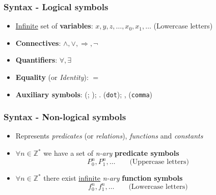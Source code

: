 \documentclass{beamer}
\begin{document}
                \begin{frame}
                    \frametitle{Syntax - Logical symbols}
                    \begin{itemize}
                        \item \underline{Infinite} set of \textbf{variables}: $ x, y, z, \dots, x_0, x_1, \dots $ (Lowercase letters)
                        \item \textbf{Connectives}: $ \wedge, \vee, \Rightarrow, \neg $
                        \item \textbf{Quantifiers}: $ \forall, \exists $
                        \item \textbf{Equality} (or \textit{Identity}): $ = $
                        \item \textbf{Auxiliary symbols}: (; ); . (\texttt{dot}); , (\texttt{comma})
                    \end{itemize}
                \end{frame}

                \begin{frame}
                    \frametitle{Syntax - Non-logical symbols}
                    \begin{itemize}
                        \item Represents \textit{predicates} (or \textit{relations}), \textit{functions} and \textit{constants}
                        \item $ \forall n \in \mathbb{Z^*} $ we have a set of \textit{n-ary} \textbf{predicate symbols}
                        \[
                            P^n_0, P^n_1, \dots \quad\quad \text{(Uppercase letters)}
                        \] 
                        \item $ \forall n \in \mathbb{Z^*} $ there exist \underline{infinite} \textit{n-ary} \textbf{function symbols}
                        \[
                            f^n_0, f^n_1, \dots \quad\quad \text{(Lowercase letters)}
                        \]
                    \end{itemize}
                \end{frame}
\end{document}
